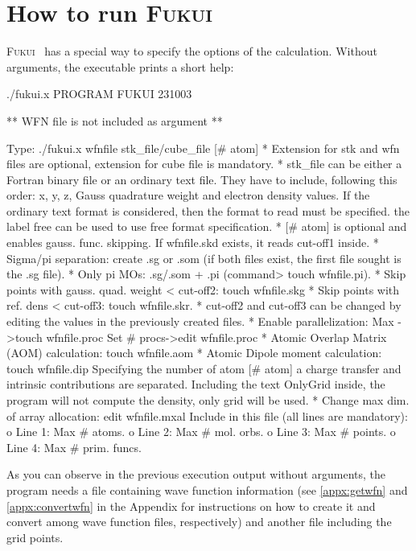 \documentclass[a4paper,11pt,openany]{memoir}
\newcommand\programa{\textsc{Fukui}}
\begin{document}
\chapter{How to run \programa}
\programa~ has a special way to specify the options of the calculation. Without arguments, the executable prints a short help:
\begin{consola}{./fukui.x}
PROGRAM FUKUI 231003

** WFN file is not included as argument **

Type: ./fukui.x wfnfile stk_file/cube_file [# atom]
 * Extension for stk and wfn files are optional, extension for cube file is mandatory.
 * stk_file can be either a Fortran binary file or an ordinary text file.
   They have to include, following this order: x, y, z, Gauss quadrature
   weight and electron density values.
   If the ordinary text format is considered, then the format to read must
   be specified. the label free can be used to use free format specification.
 * [# atom] is optional and enables gauss. func. skipping.
   If wfnfile.skd exists, it reads cut-off1 inside.
 * Sigma/pi separation: create .sg or .som (if both files exist, the first file sought is the .sg file).
 * Only pi MOs: .sg/.som + .pi (command> touch wfnfile.pi).
 * Skip points with gauss. quad. weight < cut-off2: touch wfnfile.skg
 * Skip points with ref. dens < cut-off3: touch wfnfile.skr.
 * cut-off2 and cut-off3 can be changed by editing the values in the
   previously created files.
 * Enable parallelization: Max        ->touch wfnfile.proc
   Set # procs->edit  wfnfile.proc
 * Atomic Overlap Matrix (AOM) calculation: touch wfnfile.aom
 * Atomic Dipole moment calculation: touch wfnfile.dip
   Specifying the number of atom [# atom] a charge transfer and intrinsic contributions are separated.
   Including the text OnlyGrid inside, the program will not compute the density, only grid will be used.
 * Change max dim. of array allocation: edit  wfnfile.mxal
   Include in this file (all lines are mandatory):
   o Line 1: Max # atoms.
   o Line 2: Max #    mol. orbs.
   o Line 3: Max # points.
   o Line 4: Max # prim. funcs.
 \end{consola}
As you can observe in the previous execution output without arguments, the program needs a file containing wave function information (see \autoref{appx:getwfn} and \autoref{appx:convertwfn} in the Appendix for instructions on how to create it and convert among wave function files, respectively) and another file including the grid points.
\end{document}
